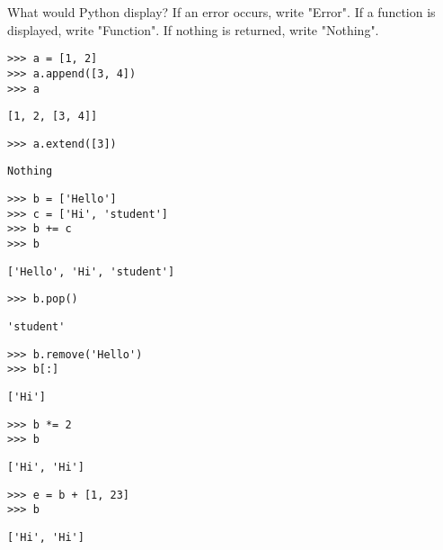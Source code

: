 \begin{blocksection}
\question What would Python display? If an error occurs, write "Error". If a function is displayed, write "Function". If nothing is returned, write "Nothing".
    
\begin{lstlisting}
>>> a = [1, 2]
>>> a.append([3, 4])
>>> a
\end{lstlisting}
\begin{solution}[0.25in]
\begin{lstlisting}
[1, 2, [3, 4]]
\end{lstlisting}
\end{solution}

\begin{lstlisting}
>>> a.extend([3])
\end{lstlisting}
\begin{solution}[0.25in]
\begin{lstlisting}
Nothing
\end{lstlisting}
\end{solution}

\begin{lstlisting}
>>> b = ['Hello']
>>> c = ['Hi', 'student']
>>> b += c
>>> b
\end{lstlisting}
\begin{solution}[0.25in]
\begin{lstlisting}
['Hello', 'Hi', 'student']
\end{lstlisting}
\end{solution}

\begin{lstlisting}
>>> b.pop()
\end{lstlisting}
\begin{solution}[0.25in]
\begin{lstlisting}
'student'
\end{lstlisting}
\end{solution}

\begin{lstlisting}
>>> b.remove('Hello')
>>> b[:]
\end{lstlisting}
\begin{solution}[0.25in]
\begin{lstlisting}
['Hi']
\end{lstlisting}
\end{solution}

\begin{lstlisting}
>>> b *= 2
>>> b
\end{lstlisting}
\begin{solution}[0.25in]
\begin{lstlisting}
['Hi', 'Hi']
\end{lstlisting}
\end{solution}

\begin{lstlisting}
>>> e = b + [1, 23]
>>> b
\end{lstlisting}
\begin{solution}[0.25in]
\begin{lstlisting}
['Hi', 'Hi']
\end{lstlisting}
\end{solution}

\end{blocksection}